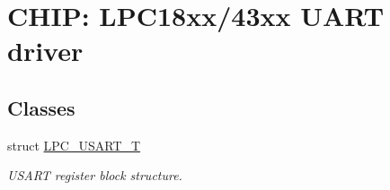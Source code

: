 \hypertarget{group___u_a_r_t__18_x_x__43_x_x}{}\section{C\+H\+IP\+: L\+P\+C18xx/43xx U\+A\+RT driver}
\label{group___u_a_r_t__18_x_x__43_x_x}
\subsection*{Classes}
\begin{DoxyCompactItemize}
\item 
struct \hyperlink{struct_l_p_c___u_s_a_r_t___t}{L\+P\+C\+\_\+\+U\+S\+A\+R\+T\+\_\+T}
\begin{DoxyCompactList}\small\item\em U\+S\+A\+RT register block structure. \end{DoxyCompactList}\end{DoxyCompactItemize}
